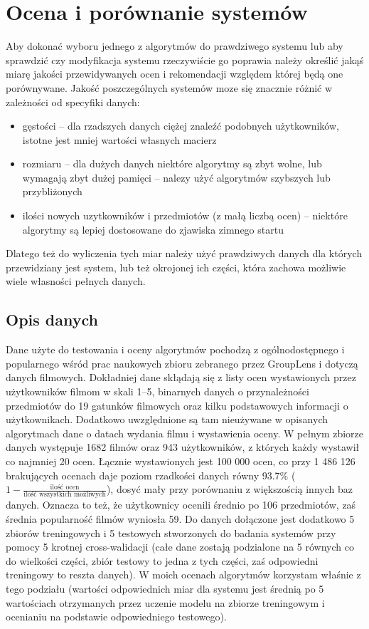 \documentclass{pracamgr}
\begin{document}
 \chapter{Ocena i porównanie systemów}
  Aby dokonać wyboru jednego z algorytmów do prawdziwego systemu lub aby sprawdzić czy modyfikacja systemu rzeczywiście go poprawia należy
  określić jakąś miarę jakości przewidywanych ocen i rekomendacji względem której będą one porównywane.\newline
  Jakość poszczególnych systemów moze się znacznie różnić w zależności od specyfiki danych:
  \begin{itemize}\itemsep1pt \parskip0pt 
   \item gęstości -- dla rzadszych danych ciężej znaleźć podobnych użytkowników, istotne jest mniej wartości własnych macierz
   \item rozmiaru -- dla dużych danych niektóre algorytmy są zbyt wolne, lub wymagają zbyt dużej pamięci
          -- nalezy użyć algorytmów szybszych lub przybliżonych 
   \item ilości nowych uzytkowników i przedmiotów (z małą liczbą ocen) -- niektóre algorytmy są lepiej dostosowane do zjawiska zimnego startu
  \end{itemize}
  Dlatego też do wyliczenia tych miar należy użyć prawdziwych danych dla których przewidziany jest system, lub też okrojonej ich części,
  która zachowa możliwie wiele własności pełnych danych.
  \section{Opis danych}
   Dane użyte do testowania i oceny algorytmów pochodzą z ogólnodostępnego i popularnego wśród prac naukowych
   zbioru zebranego przez GroupLens\newline
   \cite{ML} i dotyczą danych filmowych.\newline
   Dokładniej dane skłądają się z listy ocen wystawionych przez użytkowników filmom w skali 1--5,
   binarnych danych o przynależności przedmiotów do 19 gatunków filmowych oraz kilku podstawowych informacji o użytkownikach.
   Dodatkowo uwzględnione są tam nieużywane w opisanych algorytmach dane o datach wydania filmu i wystawienia oceny.
   W pełnym zbiorze danych występuje 1682 filmów oraz 943 użytkowników, z których każdy wystawił co najmniej 20 ocen.
   Łącznie wystawionych jest 100 000 ocen, co przy 1 486 126 brakujących ocenach daje poziom rzadkości danych równy 93.7\%
   ($1-\frac{\text{ilość ocen}}{\text{ilość wszystkich możliwych}}$), dosyć mały przy porównaniu z większością innych baz danych.
   Oznacza to też, że użytkownicy ocenili średnio po 106 przedmiotów, zaś średnia popularność filmów wyniosła 59.
   Do danych dołączone jest dodatkowo 5 zbiorów treningowych i 5 testowych stworzonych do badania systemów przy pomocy 5 krotnej cross-walidacji
   (całe dane zostają podzialone na 5 równych co do wielkości części, zbiór testowy to jedna z tych części, zaś odpowiedni treningowy to reszta danych).
   W moich ocenach algorytmów korzystam właśnie z tego podziału (wartości odpowiednich miar dla systemu jest średnią po 5 wartościach
   otrzymanych przez uczenie modelu na zbiorze treningowym i ocenianiu na podstawie odpowiedniego testowego).
\end{document}
